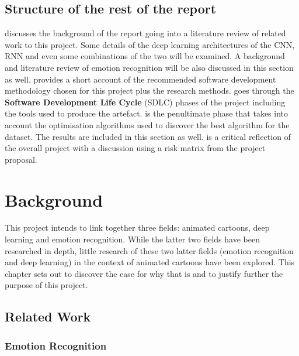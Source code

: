\documentclass[report, 11pt, oneside]{dissertation}
\begin{document}
\section{Structure of the rest of the report}

\textbf{} discusses the background of the report going into a literature review of related work to this project. Some details of the deep learning architectures of the CNN, RNN and even some combinations of the two will be examined. A background and literature review of emotion recognition will be also discussed in this section as well. \textbf{} provides a short account of the recommended software development methodology chosen for this project plus the research methods. 
	\textbf{} goes through the \textbf{Software Development Life Cycle} (SDLC) phases of the project including the tools used to produce the artefact.
	\textbf{} is the penultimate phase that takes into account the optimisation algorithms used to discover the best algorithm for the dataset. The results are included in this section as well.
	\textbf{} is a critical reflection of the overall project with a discussion using a risk matrix from the project proposal.
	


\chapter{Background} \label{chap:background}

This project intends to link together three fields: animated cartoons, deep learning and emotion recognition. While the latter two fields have been researched in depth, little research of these two latter fields (emotion recognition and deep learning) in the context of animated cartoons have been explored. This chapter sets out to discover the case for why that is and to justify further the purpose of this project.

\section{Related Work}

\subsection{Emotion Recognition}
\end{document}
